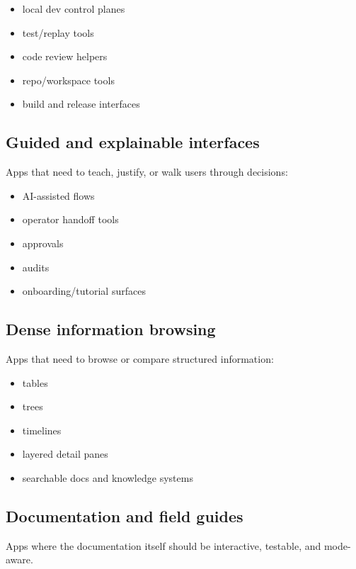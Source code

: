 \begin{itemize}
\tightlist
\item
  local dev control planes
\item
  test/replay tools
\item
  code review helpers
\item
  repo/workspace tools
\item
  build and release interfaces
\end{itemize}

\subsection{Guided and explainable interfaces}\label{record-035-guided-and-explainable-interfaces}

Apps that need to teach, justify, or walk users through decisions:

\begin{itemize}
\tightlist
\item
  AI-assisted flows
\item
  operator handoff tools
\item
  approvals
\item
  audits
\item
  onboarding/tutorial surfaces
\end{itemize}

\subsection{Dense information browsing}\label{record-035-dense-information-browsing}

Apps that need to browse or compare structured information:

\begin{itemize}
\tightlist
\item
  tables
\item
  trees
\item
  timelines
\item
  layered detail panes
\item
  searchable docs and knowledge systems
\end{itemize}

\subsection{Documentation and field guides}\label{record-035-documentation-and-field-guides}

Apps where the documentation itself should be interactive, testable, and mode-aware.

